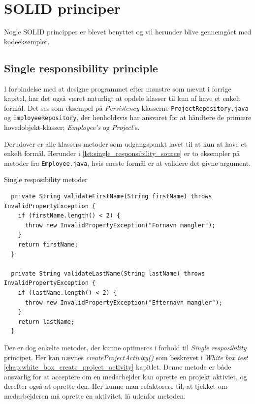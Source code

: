 \section{SOLID principer} \label{chap:solid}
Nogle SOLID principper er blevet benyttet og vil herunder blive gennemgået med kodeeksempler.

\subsection{Single responsibility principle} \label{sec:solid_s}
I forbindelse med at designe programmet efter mønstre som nævnt i forrige kapitel, har det også været naturligt at opdele klasser til kun af have et enkelt formål. Det ses som eksempel på \textit{Persistency} klasserne \texttt{ProjectRepository.java} og \texttt{EmployeeRepository}, der henholdsvis har ansvaret for at håndtere de primære hovedobjekt-klasser; \textit{Employee's} og \textit{Project}'s.

Derudover er alle klassers metoder som udgangspunkt lavet til at kun at have et enkelt formål. Herunder i \ref{lst:single_responsibility_source} er to eksempler på metoder fra \texttt{Employee.java}, hvis eneste formål er at validere det givne argument.
\begin{listing}[H]
    \centering
    \caption{Single resposibility metoder}\label{lst:single_responsibility_source}
    \begin{verbatim}
  private String validateFirstName(String firstName) throws InvalidPropertyException {
    if (firstName.length() < 2) {
      throw new InvalidPropertyException("Fornavn mangler");
    }
    return firstName;
  }

  private String validateLastName(String lastName) throws InvalidPropertyException {
    if (lastName.length() < 2) {
      throw new InvalidPropertyException("Efternavn mangler");
    }
    return lastName;
  }

    \end{verbatim}
\end{listing}


Der er dog enkelte metoder, der kunne optimeres i forhold til \textit{Single resposibility} principet. Her kan nævnes \textit{createProjectActivity()} som beskrevet i \textit{White box test} \ref{chap:white_box_create_project_activity} kapitlet. Denne metode er både ansvarlig for at acceptere om en medarbejder kan oprette en projekt aktiviet, og derefter også at oprette den. Her kunne man refaktorere til, at tjekket om medarbejderen må oprette en aktivitet, lå udenfor metoden.


